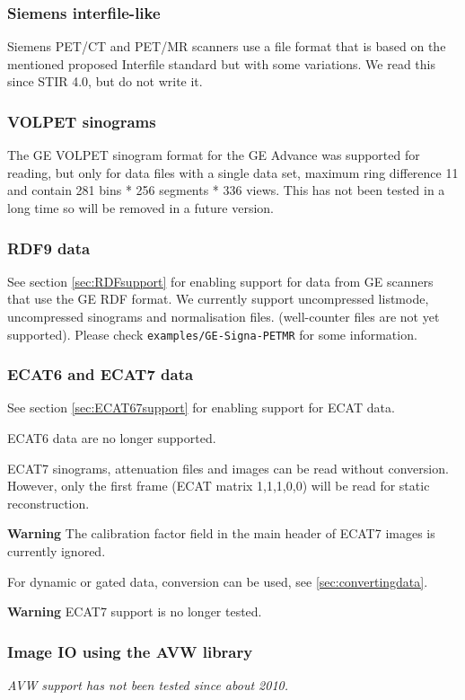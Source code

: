 \documentclass{article}
\begin{document}
\subsubsection{Siemens interfile-like}
Siemens PET/CT and PET/MR scanners use a file format that is based on the mentioned
proposed Interfile standard but with some variations. We read this since STIR 4.0,
but do not write it.

\subsubsection{VOLPET sinograms}

The GE VOLPET sinogram format for the GE Advance was supported for reading, but 
only for data files with a single data set, maximum ring 
difference 11 and contain 281 bins * 256 segments * 336 views.
This has not been tested in a long time so will be removed in a future version.

\subsubsection{RDF9 data}
See section \ref{sec:RDFsupport} for enabling support for data from GE scanners
that use the GE RDF format. We currently support uncompressed listmode,
uncompressed sinograms and normalisation files. (well-counter files are not
yet supported). Please check \texttt{examples/GE-Signa-PETMR} for some
information.

\subsubsection{ECAT6 and ECAT7 data} 
See section \ref{sec:ECAT67support} for enabling support for ECAT data.

ECAT6 data are no longer supported.

ECAT7 sinograms, attenuation files and images can be read without 
conversion. However, only the first frame (ECAT matrix 1,1,1,0,0) 
will be read for static reconstruction.

\textbf{Warning} The calibration factor field in the main header of ECAT7 images
is currently ignored.

For dynamic or gated data, conversion can be used, see \ref{sec:convertingdata}.

\textbf{Warning} ECAT7 support is no longer tested.

\subsubsection{Image IO using the AVW library}
\textit{AVW support has not been tested since about 2010.}
\end{document}

